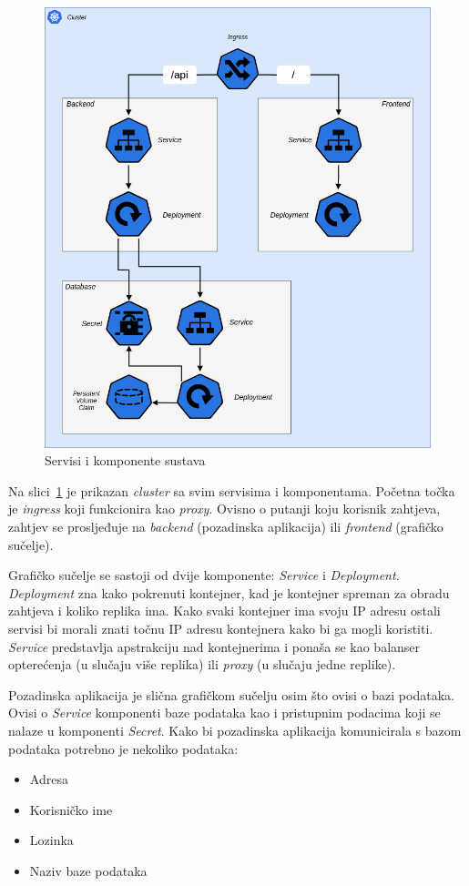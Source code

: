 \begin{figure}[h!]
    \includegraphics[width=\textwidth]{images/app-infrastructure}
    \caption{Servisi i komponente sustava}
    \label{fig:application-infrastructure}
\end{figure}

Na slici~\ref{fig:application-infrastructure} je prikazan \textit{cluster} sa svim servisima i komponentama.
Početna točka je \textit{ingress} koji funkcionira kao \textit{proxy}.
Ovisno o putanji koju korisnik zahtjeva, zahtjev se prosljeđuje na \textit{backend} (pozadinska aplikacija) ili \textit{frontend} (grafičko sučelje).

Grafičko sučelje se sastoji od dvije komponente: \textit{Service} i \textit{Deployment}.
\textit{Deployment} zna kako pokrenuti kontejner, kad je kontejner spreman za obradu zahtjeva i koliko replika ima.
Kako svaki kontejner ima svoju IP adresu ostali servisi bi morali znati točnu IP adresu kontejnera
kako bi ga mogli koristiti.
\textit{Service} predstavlja apstrakciju nad kontejnerima i ponaša se kao balanser opterećenja (u slučaju više replika)
ili \textit{proxy} (u slučaju jedne replike).

Pozadinska aplikacija je slična grafičkom sučelju osim što ovisi o bazi podataka.
Ovisi o \textit{Service} komponenti baze podataka kao i pristupnim podacima koji se nalaze u komponenti \textit{Secret}.
Kako bi pozadinska aplikacija komunicirala s bazom podataka potrebno je nekoliko podataka:
\begin{itemize}
    \item Adresa
    \item Korisničko ime
    \item Lozinka
    \item Naziv baze podataka
\end{itemize}

